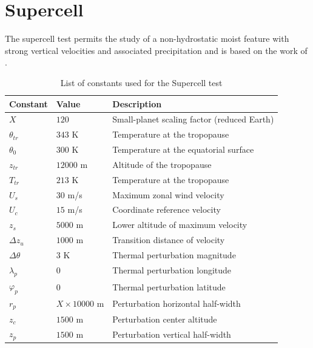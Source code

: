 \documentclass[times,doublespace]{fldauth}
\begin{document}
{\clearpage

\section{Supercell}  \label{sec:supercell}

The supercell test permits the study of a non-hydrostatic moist feature with strong vertical velocities and associated precipitation and is based on the work of \cite{klemp1978simulation}.

\begin{table}[h]

\caption{List of constants used for the Supercell test}

\begin{tabular*}{\textwidth}{@{\extracolsep{\fill}}lll}
\hline Constant & Value & Description \\
\hline
$X$ & $120$ & Small-planet scaling factor (reduced Earth)\\
$\theta_{tr}$ & $343$ K & Temperature at the tropopause \\
$\theta_0$ & $300$ K & Temperature at the equatorial surface \\
$z_{tr}$ & $12000$ m & Altitude of the tropopause \\
$T_{tr}$ & $213$ K & Temperature at the tropopause \\
$U_s$ & $30$ m/s & Maximum zonal wind velocity \\
$U_c$ & $15$ m/s & Coordinate reference velocity \\
$z_{s}$ & $5000$ m & Lower altitude of maximum velocity \\
$\Delta z_{u}$ & $1000$ m & Transition distance of velocity \\
$\Delta \theta$ & $3$ K & Thermal perturbation magnitude \\
$\lambda_p$ & $0$ & Thermal perturbation longitude \\
$\varphi_p$ & $0$ & Thermal perturbation latitude \\
$r_p$ & $X \times 10000$ m & Perturbation horizontal half-width \\
$z_{c}$ & $1500$ m & Perturbation center altitude \\
$z_{p}$ & $1500$ m & Perturbation vertical half-width \\
\hline 
\end{tabular*}

\end{table}

}
\end{document}
